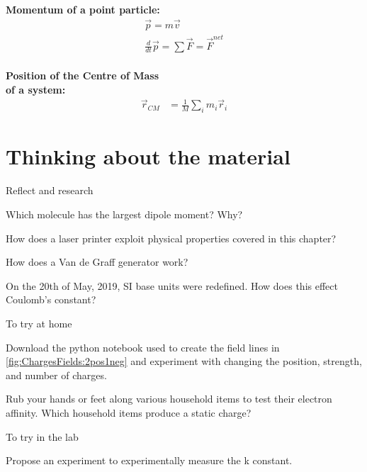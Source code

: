 \newpage
\begin{importantEquations}
\medskip
\begin{multicols}{2}
\textbf{Momentum of a point particle:}
\begin{align*}
\vec p = m\vec v \\
\frac{d}{dt}\vec p = \sum \vec F = \vec F^{net}
\end{align*}
\columnbreak
\\
\textbf{Position of the Centre of Mass \\ of a system:}
\begin{align*}
\vec r_{CM} &=\frac{1}{M}\sum_i m_i\vec r_i 
\end{align*}
\medskip
\end{multicols}
\end{importantEquations}

\newpage
\section{Thinking about the material}

\begin{chapteractivity}{Reflect and research}
{
\item Which molecule has the largest dipole moment? Why?
\item How does a laser printer exploit physical properties covered in this chapter?
\item How does a Van de Graff generator work?
\item On the 20th of May, 2019, SI base units were redefined. How does this effect Coulomb's constant?
}
\end{chapteractivity}

\begin{chapteractivity}{To try at home}
{
\item Download the python notebook used to create the field lines in \ref{fig:ChargesFields:2pos1neg} and experiment with changing the position, strength, and number of charges.
\item Rub your hands or feet along various household items to test their electron affinity. Which household items produce a static charge?
}
\end{chapteractivity}

\begin{chapteractivity}{To try in the lab}
{
\item Propose an experiment to experimentally measure the k constant.
}
\end{chapteractivity}

